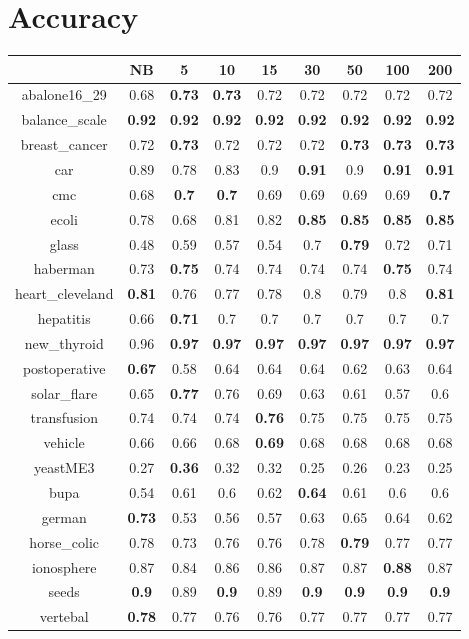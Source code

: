 \documentclass{article}%
\begin{document}
%
\normalsize%
\section*{Accuracy}%
\begin{tabular}{c|cccccccc}%
\hline%
&NB&5&10&15&30&50&100&200\\%
\hline%
abalone16\_29&0.68&\textbf{0.73}&\textbf{0.73}&0.72&0.72&0.72&0.72&0.72\\%
\hline%
balance\_scale&\textbf{0.92}&\textbf{0.92}&\textbf{0.92}&\textbf{0.92}&\textbf{0.92}&\textbf{0.92}&\textbf{0.92}&\textbf{0.92}\\%
\hline%
breast\_cancer&0.72&\textbf{0.73}&0.72&0.72&0.72&\textbf{0.73}&\textbf{0.73}&\textbf{0.73}\\%
\hline%
car&0.89&0.78&0.83&0.9&\textbf{0.91}&0.9&\textbf{0.91}&\textbf{0.91}\\%
\hline%
cmc&0.68&\textbf{0.7}&\textbf{0.7}&0.69&0.69&0.69&0.69&\textbf{0.7}\\%
\hline%
ecoli&0.78&0.68&0.81&0.82&\textbf{0.85}&\textbf{0.85}&\textbf{0.85}&\textbf{0.85}\\%
\hline%
glass&0.48&0.59&0.57&0.54&0.7&\textbf{0.79}&0.72&0.71\\%
\hline%
haberman&0.73&\textbf{0.75}&0.74&0.74&0.74&0.74&\textbf{0.75}&0.74\\%
\hline%
heart\_cleveland&\textbf{0.81}&0.76&0.77&0.78&0.8&0.79&0.8&\textbf{0.81}\\%
\hline%
hepatitis&0.66&\textbf{0.71}&0.7&0.7&0.7&0.7&0.7&0.7\\%
\hline%
new\_thyroid&0.96&\textbf{0.97}&\textbf{0.97}&\textbf{0.97}&\textbf{0.97}&\textbf{0.97}&\textbf{0.97}&\textbf{0.97}\\%
\hline%
postoperative&\textbf{0.67}&0.58&0.64&0.64&0.64&0.62&0.63&0.64\\%
\hline%
solar\_flare&0.65&\textbf{0.77}&0.76&0.69&0.63&0.61&0.57&0.6\\%
\hline%
transfusion&0.74&0.74&0.74&\textbf{0.76}&0.75&0.75&0.75&0.75\\%
\hline%
vehicle&0.66&0.66&0.68&\textbf{0.69}&0.68&0.68&0.68&0.68\\%
\hline%
yeastME3&0.27&\textbf{0.36}&0.32&0.32&0.25&0.26&0.23&0.25\\%
\hline%
bupa&0.54&0.61&0.6&0.62&\textbf{0.64}&0.61&0.6&0.6\\%
\hline%
german&\textbf{0.73}&0.53&0.56&0.57&0.63&0.65&0.64&0.62\\%
\hline%
horse\_colic&0.78&0.73&0.76&0.76&0.78&\textbf{0.79}&0.77&0.77\\%
\hline%
ionosphere&0.87&0.84&0.86&0.86&0.87&0.87&\textbf{0.88}&0.87\\%
\hline%
seeds&\textbf{0.9}&0.89&\textbf{0.9}&0.89&\textbf{0.9}&\textbf{0.9}&\textbf{0.9}&\textbf{0.9}\\%
\hline%
vertebal&\textbf{0.78}&0.77&0.76&0.76&0.77&0.77&0.77&0.77\\%
\hline%
\end{tabular}
\end{document}
